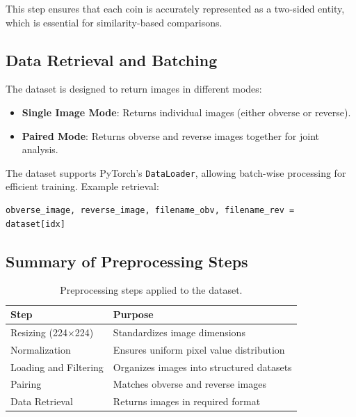 \documentclass[nolibertine, english, algorithm, nomencl, minted]{ttlab-qualify}
\begin{document}
This step ensures that each coin is accurately represented as a two-sided entity, which is essential for similarity-based comparisons.

\subsection{Data Retrieval and Batching}
The dataset is designed to return images in different modes:
\begin{itemize}
    \item \textbf{Single Image Mode}: Returns individual images (either obverse or reverse).
    \item \textbf{Paired Mode}: Returns obverse and reverse images together for joint analysis.
\end{itemize}

The dataset supports PyTorch’s \texttt{DataLoader}, allowing batch-wise processing for efficient training. Example retrieval:

\begin{footnotesize}
\begin{verbatim}
obverse_image, reverse_image, filename_obv, filename_rev = dataset[idx]
\end{verbatim}
\end{footnotesize}


\subsection{Summary of Preprocessing Steps}

\begin{table}[h]
\centering
\begin{tabular}{|l|l|}
\hline
\textbf{Step}            & \textbf{Purpose} \\
\hline
Resizing (224×224)       & Standardizes image dimensions \\
Normalization            & Ensures uniform pixel value distribution \\
Loading and Filtering    & Organizes images into structured datasets \\
Pairing                 & Matches obverse and reverse images \\
Data Retrieval          & Returns images in required format\\
\hline
\end{tabular}
\caption{Preprocessing steps applied to the dataset.}
\label{tab:preprocessing}
\end{table}
\end{document}

